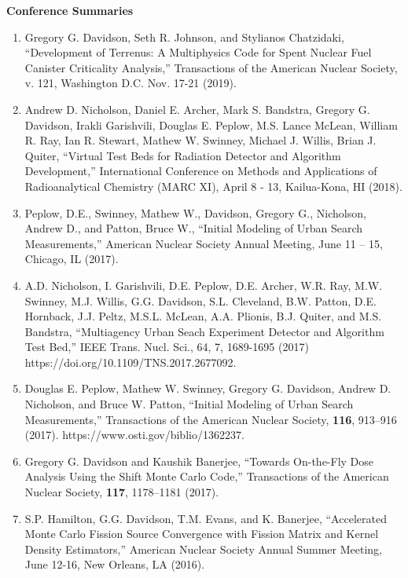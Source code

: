\documentclass[letterpaper,11pt]{article}
\newcommand{\leftsubheading}[1]{
  \textbf{#1\vspace{-6pt} \\}}
\begin{document}

\leftsubheading{Conference Summaries}
\begin{enumerate}
  \item Gregory G. Davidson, Seth R. Johnson, and Stylianos
    Chatzidaki, ``Development of Terrenus: A Multiphysics Code for
    Spent Nuclear Fuel Canister Criticality Analysis,'' Transactions
    of the American Nuclear Society, v. 121, Washington
    D.C. Nov. 17-21 (2019).
  \item Andrew D. Nicholson, Daniel E. Archer, Mark S. Bandstra,
    Gregory G. Davidson, Irakli Garishvili, Douglas E. Peplow,
    M.S. Lance McLean, William R. Ray, Ian R. Stewart, Mathew
    W. Swinney, Michael J. Willis, Brian J. Quiter, ``Virtual Test
    Beds for Radiation Detector and Algorithm Development,''
    International Conference on Methods and Applications of
    Radioanalytical Chemistry (MARC XI), April 8 - 13, Kailua-Kona,
    HI (2018).
  \item Peplow, D.E., Swinney, Mathew W., Davidson, Gregory G.,
    Nicholson, Andrew D., and Patton, Bruce W., ``Initial Modeling of
    Urban Search Measurements,'' American Nuclear Society Annual
    Meeting, June 11 – 15, Chicago, IL (2017).
  \item A.D. Nicholson, I. Garishvili, D.E. Peplow, D.E. Archer,
    W.R. Ray, M.W. Swinney, M.J. Willis, G.G. Davidson,
    S.L. Cleveland, B.W. Patton, D.E. Hornback, J.J. Peltz,
    M.S.L. McLean, A.A. Plionis, B.J. Quiter, and M.S. Bandstra,
    ``Multiagency Urban Seach Experiment Detector and Algorithm Test
    Bed,'' IEEE Trans. Nucl. Sci., 64, 7, 1689-1695 (2017)
    https://doi.org/10.1109/TNS.2017.2677092.
  \item Douglas E. Peplow, Mathew W. Swinney, Gregory G. Davidson,
    Andrew D. Nicholson, and Bruce W. Patton, ``Initial Modeling of
    Urban Search Measurements,'' Transactions of the American Nuclear
    Society, \textbf{116}, 913--916 (2017).
    https://www.osti.gov/biblio/1362237.
  \item Gregory G. Davidson and Kaushik Banerjee, ``Towards On-the-Fly
    Dose Analysis Using the Shift Monte Carlo Code,'' Transactions of
    the American Nuclear Society, \textbf{117}, 1178--1181 (2017).
  \item S.P. Hamilton, G.G. Davidson, T.M. Evans, and K. Banerjee,
    ``Accelerated Monte Carlo Fission Source Convergence with Fission
    Matrix and Kernel Density Estimators,'' American Nuclear Society
    Annual Summer Meeting, June 12-16, New Orleans, LA (2016).

\end{enumerate}
\end{document}
